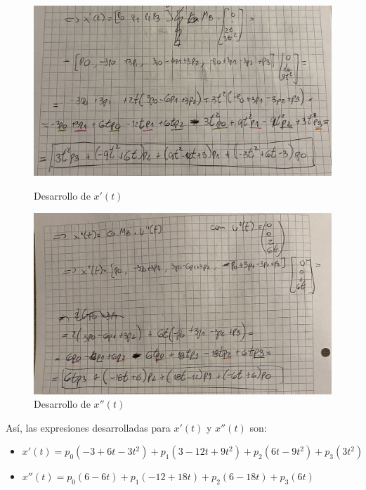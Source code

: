 \documentclass{article}
\begin{document}
\begin{figure}[H]
   \centering
    \begin{minipage}{0.45\textwidth}
        \centering
        \includegraphics[width=\textwidth]{imagenes/primderiv.jpg}
        \caption{Desarrollo de $x'(t)$}
        \label{fig:grafico1}
    \end{minipage}
    \hfill
    \begin{minipage}{0.45\textwidth}
        \centering
        \includegraphics[width=\textwidth]{imagenes/segderiv.jpg}
        \caption{Desarrollo de $x''(t)$}
        \label{fig:grafico2}
    \end{minipage}
    \label{fig:dos_graficos}
\end{figure}

Así, las expresiones desarrolladas para $x'(t)$ y $x''(t)$ son:

\begin{itemize}
    \item $x'(t) = p_0(-3 + 6t - 3t^2) + p_1(3 - 12t + 9t^2) + p_2(6t - 9t^2) + p_3(3t^2)$
    \item $x''(t) = p_0(6 - 6t) + p_1(-12 + 18t) + p_2(6 - 18t) + p_3(6t)$
\end{itemize}
\end{document}
